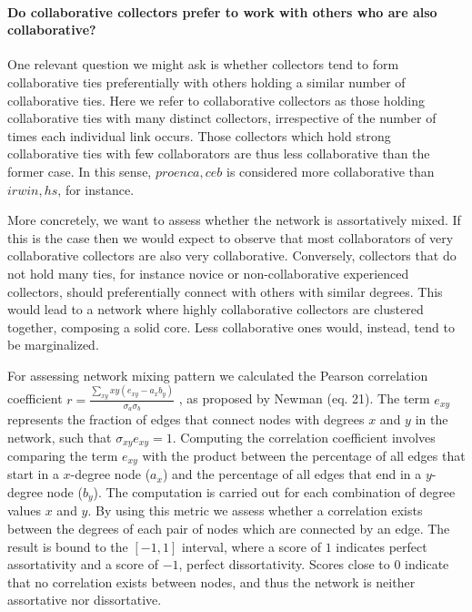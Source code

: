 \paragraph*{Do collaborative collectors prefer to work with others who are also collaborative?}
One relevant question we might ask is whether collectors tend to form collaborative ties preferentially with others holding a similar number of collaborative ties.
Here we refer to collaborative collectors as those holding collaborative ties with many distinct collectors, irrespective of the number of times each individual link occurs. Those collectors which hold strong collaborative ties with few collaborators are thus less collaborative than the former case. In this sense, $proenca,ceb$ is considered more collaborative than $irwin,hs$, for instance.

More concretely, we want to assess whether the network is assortatively mixed.
If this is the case then we would expect to observe that most collaborators of very collaborative collectors are also very collaborative.
Conversely, collectors that do not hold many ties, for instance novice or non-collaborative experienced collectors, should preferentially connect with others with similar degrees.
This would lead to a network where highly collaborative collectors are clustered together, composing a solid core. Less collaborative ones would, instead, tend to be marginalized. %

For assessing network mixing pattern we calculated the Pearson correlation coefficient $r = \frac{\sum_{xy} xy(e_{xy}-a_xb_y)}{\sigma_a \sigma_b}$ , as proposed by Newman \cite{Newman2003c} (eq. 21).
The term $e_{xy}$ represents the fraction of edges that connect nodes with degrees $x$ and $y$ in the network, such that $\sigma_{xy}e_{xy}=1$. 
Computing the correlation coefficient involves comparing the term $e_{xy}$ with the product between the percentage of all edges that start in a $x$-degree node ($a_x$) and the percentage of all edges that end in a $y$-degree node ($b_y$). The computation is carried out for each combination of degree values $x$ and $y$.
By using this metric we assess whether a correlation exists between the degrees of each pair of nodes which are connected by an edge. 
The result is bound to the $[-1,1]$ interval, where a score of $1$ indicates perfect assortativity and a score of $-1$, perfect dissortativity.
Scores close to $0$ indicate that no correlation exists between nodes, and thus the network is neither assortative nor dissortative.


